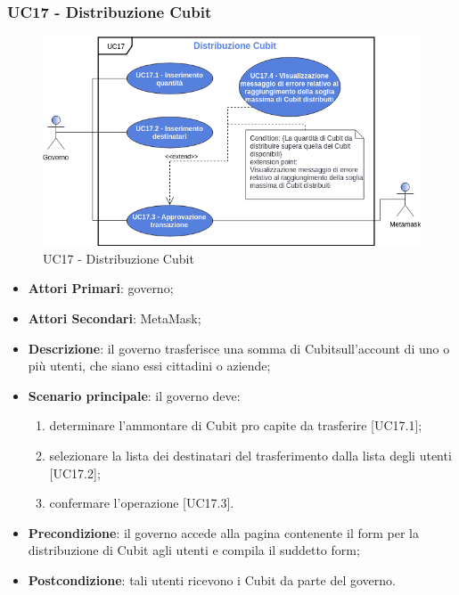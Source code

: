 \subsubsection{UC17 - Distribuzione Cubit}
\begin{figure}[h]
	\includegraphics[width=13.5cm]{res/images/UC17.png} %
	\centering
	\caption{UC17 - Distribuzione Cubit}
	
\end{figure}
\begin{itemize}
	\item \textbf{Attori Primari}: governo;
	\item \textbf{Attori Secondari}: MetaMask\glo;
	\item \textbf{Descrizione}: il governo trasferisce una somma di Cubit\glosp sull'account di uno o più  utenti, che siano essi cittadini o aziende;
	\item \textbf{Scenario principale}: il governo deve:
	 \begin{enumerate}[label=\alph*.]
		\item determinare l'ammontare di Cubit pro capite da trasferire [UC17.1];
		\item  selezionare la lista dei destinatari del trasferimento dalla lista degli utenti [UC17.2];
		\item confermare l'operazione [UC17.3].
	\end{enumerate}

	\item \textbf{Precondizione}: il governo accede alla pagina contenente il form per la distribuzione di Cubit agli utenti e compila il suddetto form;
	\item \textbf{Postcondizione}: tali utenti ricevono i Cubit da parte del governo.
\end{itemize}
